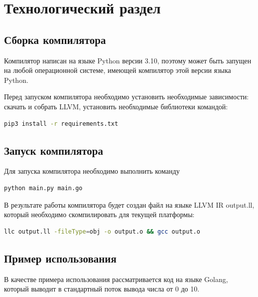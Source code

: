 \section{Технологический раздел}\label{sec:technic}
\subsection{Сборка компилятора}
Компилятор написан на языке Python версии 3.10, поэтому может быть запущен на любой операционной системе, имеющей
компилятор этой версии языка Python.

Перед запуском компилятора необходимо установить необходимые зависимости: скачать и собрать LLVM,
установить необходимые библиотеки командой:
\begin{lstlisting}[language=bash,caption={Установка зависимостей},label={lst:install}]
    pip3 install -r requirements.txt
\end{lstlisting}


\subsection{Запуск компилятора}\label{subsec:run}
Для запуска компилятора необходимо выполнить команду
\begin{lstlisting}[language=bash,caption={Установка зависимостей},label={lst:run}]
    python main.py main.go
\end{lstlisting}

В результате работы компилятора будет создан файл на языке LLVM IR output.ll, который необходимо скомпилировать для
текущей платформы:
\begin{lstlisting}[language=bash,caption={Установка зависимостей},label={lst:compile}]
    llc output.ll -fileType=obj -o output.o && gcc output.o
\end{lstlisting}

\subsection{Пример использования}
В качестве примера использования рассматривается код на языке Golang, который выводит в стандартный поток вывода числа от
0 до 10.

\begingroup
    
\endgroup

